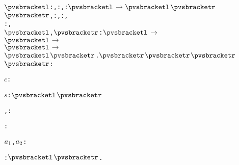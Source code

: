 \def\setsothermembertwofn#1#2{{(#1 \in #2)}}%
\def\opohtwofn#1#2{{#1\circ#2}}%
\def\opdividetwofn#1#2{{\frac{#1}{#2}}}%
\def\optimestwofn#1#2{{#1\times#2}}%
\def\opdifferenceonefn#1{{-#1}}%
\def\opdifferencetwofn#1#2{{#1-#2}}%
\def\opplustwofn#1#2{{#1+#2}}%
\begin{alltt}
\({\pvsbracketl}\): , : , \pvsid{\{||\}}: \({\pvsbracketl}\) \(\rightarrow\) \({\pvsbracketl}\)\({\pvsbracketr}\)\({\pvsbracketr}\), : , : ,
                  : ,
                  \pvsid{(} \({\pvsbracketl}\), \({\pvsbracketr}\)\pvsid{)} \pvsid{[||]}: \({\pvsbracketl}\) \(\rightarrow\)
                                                                 \({\pvsbracketl}\) \(\rightarrow\)
                                                                   \({\pvsbracketl}\) \(\rightarrow\)
                                                                     \({\pvsbracketl}\)\({\pvsbracketr}\).\({\pvsbracketr}\)\({\pvsbracketr}\)\({\pvsbracketr}\)\({\pvsbracketr}\): 

  \(c\):  \vspace*{\pvsdeclspacing}

  \(s\):  \({\pvsbracketl}\)\({\pvsbracketr}\)\vspace*{\pvsdeclspacing}

  , :  \vspace*{\pvsdeclspacing}

  :  \vspace*{\pvsdeclspacing}

  \(a\sb{1}\), \(a\sb{2}\):  \vspace*{\pvsdeclspacing}

  :  \({\pvsbracketl}\)\({\pvsbracketr}\).\vspace*{\pvsdeclspacing}


\end{alltt}
